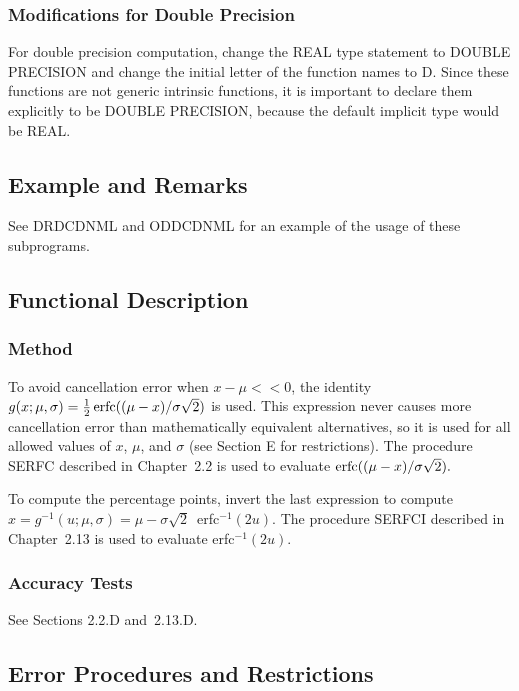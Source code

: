 \documentclass[twoside]{MATH77}
\begin{document}
\subsubsection{Modifications for Double Precision}

For double precision computation, change the REAL type statement to
DOUBLE PRECISION and change the initial letter of the function names to D.
Since these functions are not generic intrinsic functions, it is important
to declare them explicitly to be DOUBLE PRECISION, because the default
implicit type would be REAL.

\subsection{Example and Remarks}

See DRDCDNML and ODDCDNML for an example of the usage of these subprograms.

\subsection{Functional Description}

\subsubsection{Method}

To avoid cancellation error when $x-\mu << 0$, the identity $g(x;\mu
,\sigma) = \frac 12 \erfc ((\mu - x)/\sigma \sqrt 2)$ is used.  This
expression never causes more cancellation error than mathematically
equivalent alternatives, so it is used for all allowed values of $x$,
$\mu $, and $\sigma $ (see Section E for restrictions). The procedure
SERFC described in Chapter~2.2 is used to
evaluate $\erfc ((\mu - x)/\sigma \sqrt 2).$

To compute the percentage points, invert the last expression to compute $x =
g^{-1}(u;\mu ,\sigma ) = \mu - \sigma \sqrt 2$\ erfc$^{-1}(2u)$. The
procedure SERFCI described in Chapter~2.13 is used to evaluate erfc$%
^{-1}(2u).$

\subsubsection{Accuracy Tests}

See Sections 2.2.D and~2.13.D.

\subsection{Error Procedures and Restrictions}
\end{document}
